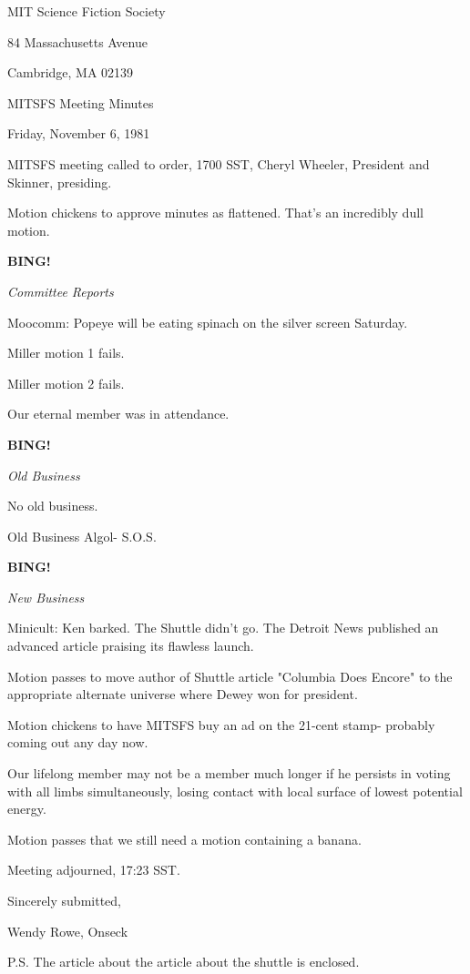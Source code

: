 \documentclass[12pt]{article}
\newcommand{\bing}{{\bf BING!} }
\newcommand{\goto}[1]{\bing \vskip 12pt \centerline{{\em{#1}}}}
\begin{document}
\begin{center}

MIT Science Fiction Society 

84 Massachusetts Avenue

Cambridge, MA 02139

\vspace{12pt}

MITSFS Meeting Minutes 

Friday, November 6, 1981

\end{center}
 
\vspace{18pt}

\setlength{\parskip}{6pt}

\noindent
MITSFS meeting called to order, 1700 SST,
Cheryl Wheeler, President and Skinner, presiding.

Motion chickens to approve minutes as flattened. That's an incredibly dull motion.

\goto{Committee Reports}

Moocomm: Popeye will be eating spinach on the silver screen Saturday.

Miller motion 1 fails.

Miller motion 2 fails.

Our eternal member was in attendance.

\goto{Old Business}

No old business.

Old Business Algol- S.O.S.

\goto{New Business}

Minicult: Ken barked. The Shuttle didn't go. The Detroit News published an advanced article praising its flawless launch.

Motion passes to move author of Shuttle article "Columbia Does Encore" to the appropriate alternate universe where Dewey won for president.

Motion chickens to have MITSFS buy an ad on the 21-cent stamp- probably coming out any day now.

Our lifelong member may not be a member much longer if he persists in voting with all limbs simultaneously, losing contact with local surface of lowest potential energy.

Motion passes that we still need a motion containing a banana.

\vspace{12pt}

\noindent
Meeting adjourned, 17:23 SST.

\vspace{18pt}

\centerline{Sincerely submitted,}
\centerline{Wendy Rowe, Onseck}

P.S. The article about the article about the shuttle is enclosed.
\end{document}
